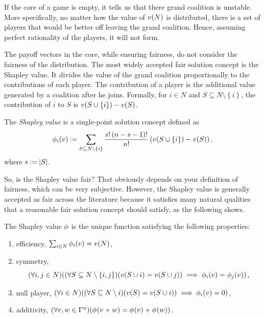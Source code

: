 If the core of a game is empty, it tells us that there grand coalition is unstable.
More specifically, no matter how the value of $ \fce{v}{N} $ is distributed, there is a set of players that would be better off leaving the grand coalition.
Hence, assuming perfect rationality of the players, it will not form.

The payoff vectors in the core, while ensuring fairness, do not consider the fairness of the distribution.
The most widely accepted fair solution concept is the Shapley value.
It divides the value of the grand coalition proportionally to the contributions of each player.
The contribution of a player is the additional value generated by a coalition after he joins.
Formally, for $ i \in N $ and $ S \subseteq N \setminus \left\{ i \right\} $, the contribution of $ i $ to $ S $ is $ \fce{v}{S \cup \left\{ i \right\}} - \fce{v}{S} $.

\begin{defi}
	The \emph{Shapley value} is a single-point solution concept defined as \[
		\shapley[i] v \deq \sum_{S \subseteq N \setminus \left\{ i \right\}}^{} \frac{s! \left( n - s - 1 \right)!}{n!} \left( \fce{v}{S \cup \left\{ i \right\}} - \fce{v}{S} \right),
	\]
	where $ s \deq \absolute{S} $.
\end{defi}

So, is the Shapley value fair?
That obviously depends on your definition of fairness, which can be very subjective.
However, the Shapley value is generally accepted as fair across the literature because it satisfies many natural qualities that a reasonable fair solution concept should satisfy, as the following shows.

\begin{prop}
	The Shapley value $ \Shapley $ is the unique function satisfying the following properties: \begin{enumerate}[ ]
		\item efficiency, $ \sum_{i \in N}^{} \shapley[i]{v} = \fce{v}{N} $,
		\item symmetry, \[
				\left( \forall i,j \in N \right)\! \left( \left( \forall S \subseteq N \setminus \left\{ i,j \right\} \right)\! \left( \fce{v}{S \cup i} = \fce{v}{S \cup j} \right) \implies \shapley[i]{v} = \shapley[j]{v} \right),
			\]
		\item null player, $ \left( \forall i \in N \right)\! \left( \left( \forall S \subseteq N \setminus i \right)\! \left( \fce{v}{S} = \fce{v}{S \cup i} \right) \implies \shapley[i]{v} = 0 \right)   $,
		\item additivity, $ \left( \forall v,w \in \games n \right)\! \left( \shapley{v + w} = \shapley{v} + \shapley{w} \right) $.
	\end{enumerate}
\end{prop}

